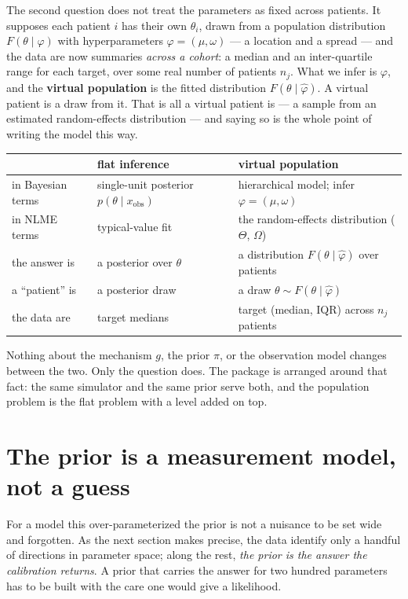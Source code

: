 \documentclass[11pt]{article}
\newcommand{\vocab}[1]{\textcolor{vocabc}{\textbf{#1}}}
\renewcommand{\th}{\theta}
\newcommand{\xobs}{x_{\mathrm{obs}}}
\begin{document}
The second question does not treat the parameters as fixed across patients. It supposes
each patient $i$ has their own $\th_i$, drawn from a population distribution
$F(\th \mid \varphi)$ with hyperparameters $\varphi = (\mu, \omega)$ --- a location and a
spread --- and the data are now summaries \emph{across a cohort}: a median and an
inter-quartile range for each target, over some real number of patients $n_j$. What we
infer is $\varphi$, and the \vocab{virtual population} is the fitted distribution
$F(\th \mid \hat\varphi)$. A virtual patient is a draw from it. That is all a virtual
patient is --- a sample from an estimated random-effects distribution --- and saying so
is the whole point of writing the model this way.

\begin{center}
\small
\begin{tabularx}{\textwidth}{@{}l X X@{}}
\toprule
 & \textbf{flat inference} & \textbf{virtual population} \\
\midrule
in Bayesian terms & single-unit posterior $p(\th\mid\xobs)$ & hierarchical model; infer $\varphi=(\mu,\omega)$ \\
in NLME terms & typical-value fit & the random-effects distribution ($\Theta$, $\Omega$) \\
the answer is & a posterior over $\th$ & a distribution $F(\th\mid\hat\varphi)$ over patients \\
a ``patient'' is & a posterior draw & a draw $\th\sim F(\th\mid\hat\varphi)$ \\
the data are & target medians & target (median, IQR) across $n_j$ patients \\
\bottomrule
\end{tabularx}
\end{center}

Nothing about the mechanism $g$, the prior $\pi$, or the observation model changes
between the two. Only the question does. The package is arranged around that fact: the
same simulator and the same prior serve both, and the population problem is the flat
problem with a level added on top.

\section{The prior is a measurement model, not a guess}

For a model this over-parameterized the prior is not a nuisance to be set wide and
forgotten. As the next section makes precise, the data identify only a handful of
directions in parameter space; along the rest, \emph{the prior is the answer the
calibration returns}. A prior that carries the answer for two hundred parameters has to
be built with the care one would give a likelihood.
\end{document}
